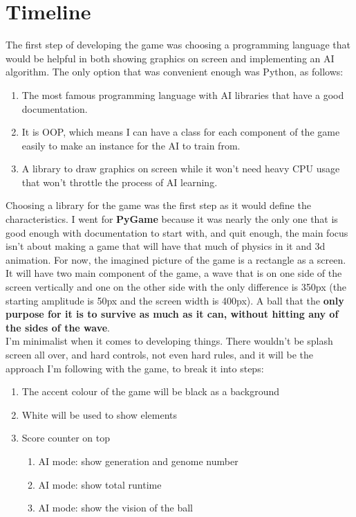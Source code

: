 
\chapter{Timeline}
The first step of developing the game was choosing a programming language that would be helpful in both showing graphics on screen and implementing an AI algorithm. The only option that was convenient enough was Python, as follows:

\begin{enumerate}
	\item The most famous programming language with AI libraries that have a good documentation.
	\item It is OOP, which means I can have a class for each component of the game easily to make an instance for the AI to train from.
	\item A library to draw graphics on screen while it won't need heavy CPU usage that won't throttle the process of AI learning.
\end{enumerate}

Choosing a library for the game was the first step as it would define the characteristics. I went for \textbf{PyGame} because it was nearly the only one that is good enough with documentation to start with, and quit enough, the main focus isn't about making a game that will have that much of physics in it and 3d animation. For now, the imagined picture of the game is a rectangle as a screen. It will have two main component of the game, a wave that is on one side of the screen vertically and one on the other side with the only difference is 350px (the starting amplitude is 50px and the screen width is 400px). A ball that the \textbf{only purpose for it is to survive as much as it can, without hitting any of the sides of the wave}.\\


I'm minimalist when it comes to developing things. There wouldn't be splash screen all over, and hard controls, not even hard rules, and it will be the approach I'm following with the game, to break it into steps:

\begin{enumerate}
	\item The accent colour of the game will be black as a background
	\item White will be used to show elements 
	\item Score counter on top
	  \begin{enumerate}
		\item AI mode: show generation and genome number
		\item AI mode: show total runtime
		\item AI mode: show the vision of the ball
	\end{enumerate}
\end{enumerate}

